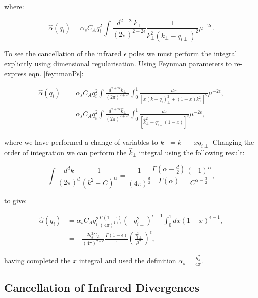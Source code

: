 		where:

		\begin{equation}
			\hat{\alpha}(q_i) = \alpha_sC_Aq_i^2\int \frac{d^{2+2\epsilon}k_{\perp}}{(2\pi)^{2+2\epsilon}}
			\frac{1}{k^2_\perp(k_\perp - q_{i\perp})^2}\mu^{-2\epsilon}.
			\label{eqn:feynmanPs}
		\end{equation}

		To see the cancellation of the infrared $\epsilon$ poles we must perform the integral
		explicitly using dimensional regularisation. Using Feynman parameters to re-express
		eqn. \eqref{feynmanPs}:

		\begin{align}
			\hat{\alpha}(q_i) &= \alpha_sC_Aq_i^2\int \frac{d^{2+2\epsilon}k_{\perp}}{(2\pi)^{2+2\epsilon}}\int_0^1
				\frac{dx}{[x(k - q_{i})^2_\perp + (1-x)k_\perp^2]^2}\mu^{-2\epsilon}, \\
				&= \alpha_sC_Aq_i^2\int \frac{d^{2+2\epsilon}\hat{k}_{\perp}}{(2\pi)^{2+2\epsilon}}\int_0^1
				\frac{dx}{[\hat{k}^2 _\perp + q_{i\perp}^2(1-x)]^2}\mu^{-2\epsilon},
		\end{align}

		where we have performed a change of variables to $\hat{k}_\perp = k_\perp - xq_{i\perp}$
		Changing the order of integration we can perform the $\hat{k}_\perp$ integral
		using the following result:

		\begin{equation}
			\int \frac{d^dk}{(2\pi)^d}\frac{1}{(k^2 - C)^\alpha} = \frac{1}{(4\pi)^{\frac{d}{2}}}
				\frac{\Gamma(\alpha - \frac{d}{2})}{\Gamma(\alpha)}
				\frac{(-1)^\alpha}{C^{\alpha - \frac{d}{2}}},
		\end{equation}

		to give:

		\begin{align}
			\hat{\alpha}(q_i) &= \alpha_sC_Aq_i^2\frac{\Gamma(1-\epsilon)}{(4\pi)^{1+\epsilon}}
			(-q_{i\perp}^2)^{\epsilon-1}
			\int_0^1 dx(1-x)^{\epsilon-1}, \\
			&= -\frac{2g_s^2C_A}{(4\pi)^{2+\epsilon}}\frac{\Gamma(1-\epsilon)}{\epsilon}
			\left(\frac{q_{i\perp}^2}{\mu^2}\right)^\epsilon,
		\end{align}

		having completed the $x$ integral and used the definition $\alpha_s=\frac{g_s^2}{4\pi}$.

	\subsection{Cancellation of Infrared Divergences}
		\label{sub:cancellation}

